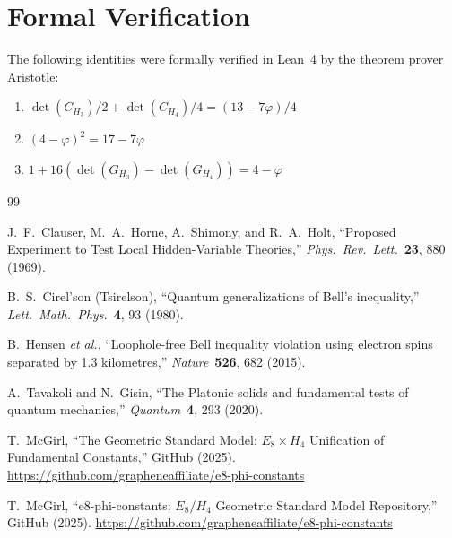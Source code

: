 \documentclass[12pt,a4paper]{article}
\newcommand{\vp}{\varphi}
\newcommand{\detG}[1]{\det(G_{#1})}
\newcommand{\detC}[1]{\det(C_{#1})}
\begin{document}
\section{Formal Verification}
\label{app:lean}

The following identities were formally verified in Lean~4 by the theorem 
prover Aristotle:
\begin{enumerate}
\item $\detC{H_3}/2 + \detC{H_4}/4 = (13-7\vp)/4$
\item $(4-\vp)^2 = 17 - 7\vp$
\item $1 + 16(\detG{H_3} - \detG{H_4}) = 4 - \vp$
\end{enumerate}

\begin{thebibliography}{99}

J.~F.~Clauser, M.~A.~Horne, A.~Shimony, and R.~A.~Holt,
``Proposed Experiment to Test Local Hidden-Variable Theories,''
\emph{Phys.\ Rev.\ Lett.}\ \textbf{23}, 880 (1969).

B.~S.~Cirel'son (Tsirelson),
``Quantum generalizations of Bell's inequality,''
\emph{Lett.\ Math.\ Phys.}\ \textbf{4}, 93 (1980).

B.~Hensen \emph{et al.},
``Loophole-free Bell inequality violation using electron spins separated by 1.3 kilometres,''
\emph{Nature}\ \textbf{526}, 682 (2015).

A.~Tavakoli and N.~Gisin,
``The Platonic solids and fundamental tests of quantum mechanics,''
\emph{Quantum}\ \textbf{4}, 293 (2020).

T.~McGirl,
``The Geometric Standard Model: $E_8 \times H_4$ Unification of Fundamental Constants,''
GitHub (2025).
\url{https://github.com/grapheneaffiliate/e8-phi-constants}

T.~McGirl,
``e8-phi-constants: $E_8/H_4$ Geometric Standard Model Repository,''
GitHub (2025).
\url{https://github.com/grapheneaffiliate/e8-phi-constants}

\end{thebibliography}
\end{document}
